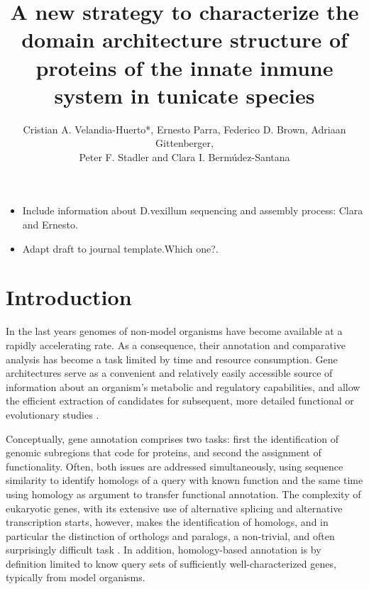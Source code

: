 \documentclass[11pt]{article}
\newcommand{\TODO}[1]{\begingroup\color{red}#1\endgroup}
\newcommand{\PFS}[1]{\begingroup\color{blue}#1\endgroup}
\begin{document}
\title{A new strategy to characterize the domain architecture structure of 
proteins of the innate inmune system in tunicate species}
\author{Cristian A. Velandia-Huerto*, Ernesto Parra, Federico D. 
Brown, Adriaan Gittenberger, \\ Peter F. Stadler and Clara I. 
Berm\'{u}dez-Santana}


\maketitle

\begin{itemize}
\item \TODO{Include information about D.vexillum sequencing and assembly 
process: Clara and Ernesto.}
\item Adapt draft to journal template.\TODO{Which one?}. 
\end{itemize}

\section*{Introduction}

\PFS{In the last years genomes of non-model organisms have become available
  at a rapidly accelerating rate. As a consequence, their annotation and
  comparative analysis has become a task limited by time and resource
  consumption. Gene architectures serve as a convenient and relatively
  easily accessible source of information about an organism's metabolic and
  regulatory capabilities, and allow the efficient extraction of candidates
  for subsequent, more detailed functional or evolutionary studies
  \cite{aken2016ensembl,birney2004overview,ashburner2000gene,tatusov2000cog,tatusova2016ncbi}.}
  
  \PFS{Conceptually, gene annotation comprises two tasks: first the
  identification of genomic subregions that code for proteins, and second
  the assignment of functionality. Often, both issues are addressed
  simultaneously, using sequence similarity to identify homologs of a query
  with known function and the same time using homology as argument to
  transfer functional annotation. The complexity of eukaryotic genes, with
  its extensive use of alternative splicing and alternative transcription
  starts, however, makes the identification of homologs, and in particular
  the distinction of orthologs and paralogs, a non-trivial, and often
  surprisingly difficult task \cite{yandell2012}. In addition,
  homology-based annotation is by definition limited to know query sets of
  sufficiently well-characterized genes, typically from model organisms.}
\end{document}
